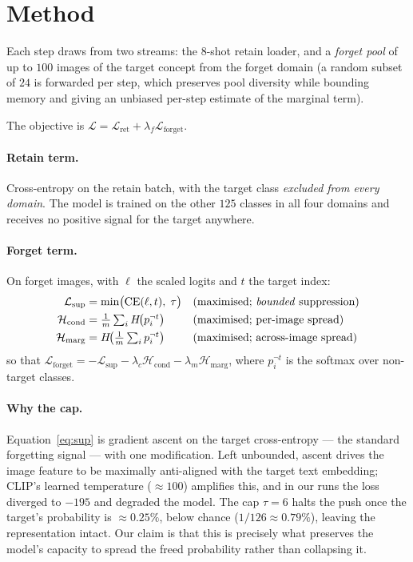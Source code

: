 \documentclass[10pt]{article}
\begin{document}
\section{Method}
\label{sec:method}

Each step draws from two streams: the $8$-shot retain loader, and a
\emph{forget pool} of up to $100$ images of the target concept from the forget
domain (a random subset of $24$ is forwarded per step, which preserves pool
diversity while bounding memory and giving an unbiased per-step estimate of the
marginal term).

The objective is $\mathcal{L} = \mathcal{L}_{\text{ret}} + \lambda_f
\mathcal{L}_{\text{forget}}$.

\paragraph{Retain term.} Cross-entropy on the retain batch, with the target
class \emph{excluded from every domain}. The model is trained on the other $125$
classes in all four domains and receives no positive signal for the target
anywhere.

\paragraph{Forget term.} On forget images, with $\ell$ the scaled logits and $t$
the target index:
\begin{align}
\mathcal{L}_{\text{sup}} &= \min\!\big(\mathrm{CE}(\ell, t),\; \tau\big)
  && \text{(maximised; \emph{bounded} suppression)} \label{eq:sup}\\
\mathcal{H}_{\text{cond}} &= \tfrac{1}{m}\textstyle\sum_i H\!\big(p_i^{\neg t}\big)
  && \text{(maximised; per-image spread)} \label{eq:hcond}\\
\mathcal{H}_{\text{marg}} &= H\!\big(\tfrac{1}{m}\textstyle\sum_i p_i^{\neg t}\big)
  && \text{(maximised; across-image spread)} \label{eq:hmarg}
\end{align}
so that $\mathcal{L}_{\text{forget}} = -\mathcal{L}_{\text{sup}}
- \lambda_c \mathcal{H}_{\text{cond}} - \lambda_m \mathcal{H}_{\text{marg}}$,
where $p_i^{\neg t}$ is the softmax over non-target classes.

\paragraph{Why the cap.} Equation~\eqref{eq:sup} is gradient ascent on the target
cross-entropy --- the standard forgetting signal --- with one modification. Left
unbounded, ascent drives the image feature to be maximally anti-aligned with the
target text embedding; CLIP's learned temperature ($\approx\!100$) amplifies
this, and in our runs the loss diverged to $-195$ and degraded the model. The cap
$\tau=6$ halts the push once the target's probability is $\approx 0.25\%$, below
chance ($1/126 \approx 0.79\%$), leaving the representation intact. Our claim is
that this is precisely what preserves the model's capacity to spread the freed
probability rather than collapsing it.
\end{document}

